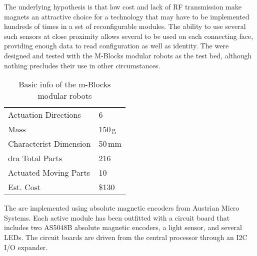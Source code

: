 The underlying hypothesis is that low cost and lack of RF transmission make magnets an attractive choice for a technology that may have to be implemented hundreds of times in a set of reconfigurable modules. The ability to use several such sensors at close proximity allows several to be used on each connecting face, providing enough data to read configuration as well as identity. The \tagNamePlural were designed and tested with the M-Blocks modular robots as the test bed, although nothing precludes their use in other circumstances.

\begin{table}[b]
  \caption{Basic info of the m-Blocks modular robots}

  \begin{tabular}{ p{3.4cm}  p{1.9cm} }
    \hline
    Actuation Directions & 6 \\
    Mass  & 150\,g \\
    Characterist Dimension & 50\,mm \\dra
    Total Parts  & 216 \\
    Actuated Moving Parts  & 10 \\
    Est. Cost & \$130 \\

  \end{tabular}

    \label{tab:hardwareOverviewTable}
\end{table}

The \tagNamePlural are implemented using absolute magnetic encoders from Austrian Micro Systems. Each active module has been outfitted with a circuit board that
includes two AS5048B absolute magnetic encoders, a light sensor, and several LEDs. The circuit boards are driven from the central processor 
through an I2C I/O expander.

